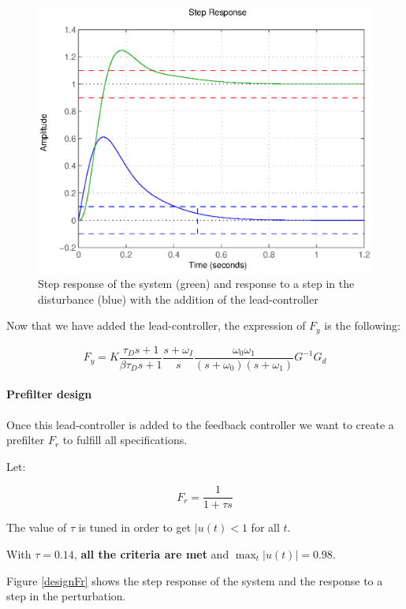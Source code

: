 \begin{figure}[h!t]
    \includegraphics[width=\columnwidth]{fig/designLeadLag.eps}
    \caption{Step response of the system (green) and response to a step in the disturbance (blue) with the addition of the lead-controller}
    \label{designLeadLag}
\end{figure}

Now that we have added the lead-controller, the expression of $F_y$ is the following:

$$F_y = K \frac{\tau_D s + 1}{\beta \tau_D s +1}\frac{s + \omega_I}{s} \frac{\omega_0\omega_1}{(s+\omega_0)(s+\omega_1)} G^{-1} G_d $$


\paragraph{Prefilter design}

Once this lead-controller is added to the feedback controller we want to create a prefilter $F_r$ to fulfill all specifications. 

Let:

$$F_r = \frac{1}{1 + \tau s}$$

The value of $\tau$ is tuned in order to get $|u(t) < 1$ for all $t$.

With $\tau = 0.14$, \textbf{all the criteria are met} and $\max_{t} |u(t)| = 0.98$.

Figure \ref{designFr} shows the step response of the system and the response to a step in the perturbation.



